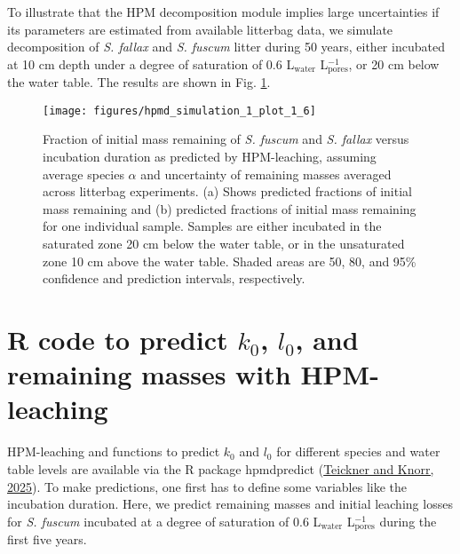 \documentclass[
  12pt,
]{article}
\begin{document}
To illustrate that the HPM decomposition module implies large uncertainties if its parameters are estimated from available litterbag data, we simulate decomposition of \emph{S. fallax} and \emph{S. fuscum} litter during 50 years, either incubated at 10 cm depth under a degree of saturation of 0.6 L\(_\text{water}\) L\(_\text{pores}^{-1}\), or 20 cm below the water table. The results are shown in Fig. \ref{fig:sup-hpmd-simulation-1-plot-6}.



\begin{figure}[H]

{\centering \texttt{[image: figures/hpmd\_simulation\_1\_plot\_1\_6]} 

}

\caption{Fraction of initial mass remaining of \emph{S. fuscum} and \emph{S. fallax} versus incubation duration as predicted by HPM-leaching, assuming average species \(\alpha\) and uncertainty of remaining masses averaged across litterbag experiments. (a) Shows predicted fractions of initial mass remaining and (b) predicted fractions of initial mass remaining for one individual sample. Samples are either incubated in the saturated zone 20 cm below the water table, or in the unsaturated zone 10 cm above the water table. Shaded areas are 50, 80, and 95\% confidence and prediction intervals, respectively.}\label{fig:sup-hpmd-simulation-1-plot-6}
\end{figure}

\hypertarget{sup-7}{%
\section{\texorpdfstring{R code to predict \(k_0\), \(l_0\), and remaining masses with HPM-leaching}{R code to predict k\_0, l\_0, and remaining masses with HPM-leaching}}\label{sup-7}}

HPM-leaching and functions to predict \(k_0\) and \(l_0\) for different species and water table levels are available via the R package hpmdpredict (\protect\hyperlink{ref-Teickner.2025b}{Teickner and Knorr, 2025}). To make predictions, one first has to define some variables like the incubation duration. Here, we predict remaining masses and initial leaching losses for \emph{S. fuscum} incubated at a degree of saturation of 0.6 L\(_\text{water}\) L\(_\text{pores}^{-1}\) during the first five years.
\end{document}
